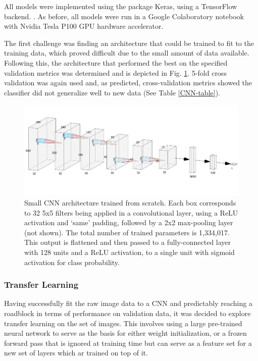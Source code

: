 \documentclass{article}
\begin{document}
	All models were implemented using the package Keras, using a TensorFlow backend. \cite{chollet2015keras}.  As before, all models were run in a Google Colaboratory notebook with Nvidia Tesla P100 GPU hardware accelerator.
	
	The first challenge was finding an architecture that could be trained to fit to the training data, which proved difficult due to the small amount of data available. Following this, the architecture that performed the best on the specified validation metrics was determined and is depicted in Fig. \ref{small-cnn}. 5-fold cross validation was again used and, as predicted, cross-validation metrics showed the classifier did not generalize well to new data (See Table 
	\ref{CNN-table}). 
	
	\begin{figure}[]
		\vskip 0.2in
		\begin{center}
			\centerline{\includegraphics[width=\columnwidth]{Archi2}}
			\caption{Small CNN architecture trained from scratch. Each box corresponds to 32 5x5 filters being applied in a convolutional layer, using a ReLU activation and `same' padding, followed by a 2x2 max-pooling layer (not shown). The total number of trained parameters is 1,334,017. This output is flattened and then passed to a fully-connected layer with 128 units and a ReLU activation, to a single unit with sigmoid activation for class probability.}
			\label{small-cnn}
		\end{center}
		\vskip -0.2in
	\end{figure}
	
	\subsubsection{Transfer Learning}
	Having successfully fit the raw image data to a CNN and predictably reaching a roadblock in terms of performance on validation data, it was decided to explore transfer learning on the set of images. This involves using a large pre-trained neural network to serve as the basis for either weight initialization, or a frozen forward pass that is ignored at training time but can serve as a feature set for a new set of layers which ar trained on top of it. 
	
\end{document}
